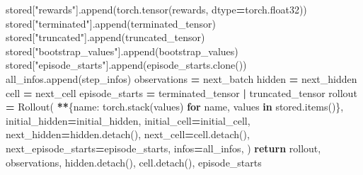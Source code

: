 \documentclass[
  chinese,
  11pt,
  letterpaper,
]{article}
\newenvironment{Shaded}{\begin{snugshade}}{\end{snugshade}}
\newcommand{\ControlFlowTok}[1]{\textcolor[rgb]{0.13,0.29,0.53}{\textbf{#1}}}
\newcommand{\KeywordTok}[1]{\textcolor[rgb]{0.13,0.29,0.53}{\textbf{#1}}}
\newcommand{\NormalTok}[1]{#1}
\newcommand{\OperatorTok}[1]{\textcolor[rgb]{0.81,0.36,0.00}{\textbf{#1}}}
\newcommand{\StringTok}[1]{\textcolor[rgb]{0.31,0.60,0.02}{#1}}
\renewenvironment{Shaded}{\par\smallskip}{\par\smallskip}
\begin{document}
\begin{Shaded}
\begin{Highlighting}[]
\NormalTok{        stored[}\StringTok{"rewards"}\NormalTok{].append(torch.tensor(rewards, dtype}\OperatorTok{=}\NormalTok{torch.float32))}
\NormalTok{        stored[}\StringTok{"terminated"}\NormalTok{].append(terminated\_tensor)}
\NormalTok{        stored[}\StringTok{"truncated"}\NormalTok{].append(truncated\_tensor)}
\NormalTok{        stored[}\StringTok{"bootstrap\_values"}\NormalTok{].append(bootstrap\_values)}
\NormalTok{        stored[}\StringTok{"episode\_starts"}\NormalTok{].append(episode\_starts.clone())}
\NormalTok{        all\_infos.append(step\_infos)}
\NormalTok{        observations }\OperatorTok{=}\NormalTok{ next\_batch}
\NormalTok{        hidden }\OperatorTok{=}\NormalTok{ next\_hidden}
\NormalTok{        cell }\OperatorTok{=}\NormalTok{ next\_cell}
\NormalTok{        episode\_starts }\OperatorTok{=}\NormalTok{ terminated\_tensor }\OperatorTok{|}\NormalTok{ truncated\_tensor}
\NormalTok{    rollout }\OperatorTok{=}\NormalTok{ Rollout(}
        \OperatorTok{**}\NormalTok{\{name: torch.stack(values) }\ControlFlowTok{for}\NormalTok{ name, values }\KeywordTok{in}\NormalTok{ stored.items()\},}
\NormalTok{        initial\_hidden}\OperatorTok{=}\NormalTok{initial\_hidden,}
\NormalTok{        initial\_cell}\OperatorTok{=}\NormalTok{initial\_cell,}
\NormalTok{        next\_hidden}\OperatorTok{=}\NormalTok{hidden.detach(),}
\NormalTok{        next\_cell}\OperatorTok{=}\NormalTok{cell.detach(),}
\NormalTok{        next\_episode\_starts}\OperatorTok{=}\NormalTok{episode\_starts,}
\NormalTok{        infos}\OperatorTok{=}\NormalTok{all\_infos,}
\NormalTok{    )}
    \ControlFlowTok{return}\NormalTok{ rollout, observations, hidden.detach(), cell.detach(), episode\_starts}



\end{Highlighting}
\end{Shaded}
\end{document}
